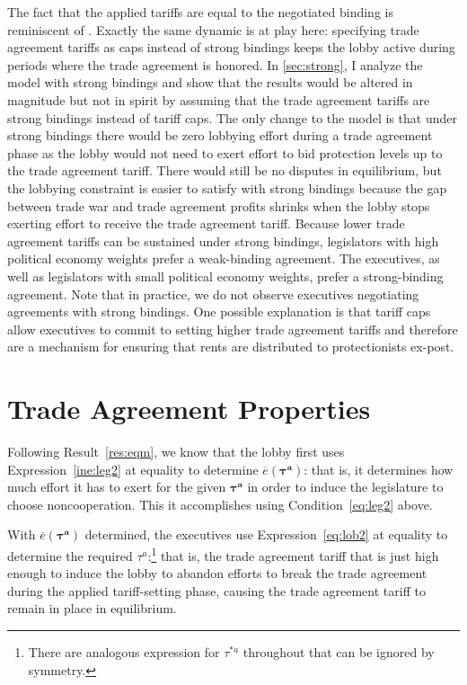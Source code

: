 \documentclass[authoryear, review]{elsarticle}
\newcommand{\ov}{\overline}
\newcommand{\bta}{\bm{\tau^a}}
\begin{document}
The fact that the applied tariffs are equal to the negotiated binding is reminiscent of \citet{mrc2007}. Exactly the same dynamic is at play here: specifying trade agreement tariffs as caps instead of strong bindings keeps the lobby active during periods where the trade agreement is honored. In \ref{sec:strong}, I analyze the model with strong bindings and show that the results would be altered in magnitude but not in spirit by assuming that the trade agreement tariffs are strong bindings instead of tariff caps. The only change to the model is that under strong bindings there would be zero lobbying effort during a trade agreement phase as the lobby would not need to exert effort to bid protection levels up to the trade agreement tariff. There would still be no disputes in equilibrium, but the lobbying constraint is easier to satisfy with strong bindings because the gap between trade war and trade agreement profits shrinks when the lobby stops exerting effort to receive the trade agreement tariff. Because lower trade agreement tariffs can be sustained under strong bindings, legislators with high political economy weights prefer a weak-binding agreement. The executives, as well as legislators with small political economy weights, prefer a strong-binding agreement. Note that in practice, we do not observe executives negotiating agreements with strong bindings. One possible explanation is that tariff caps allow executives to commit to setting higher trade agreement tariffs and therefore are a mechanism for ensuring that rents are distributed to protectionists ex-post.

\section{Trade Agreement Properties}
\label{sec:prop}
Following Result~\ref{res:eqm}, we know that the lobby first uses Expression~\ref{ine:leg2} at equality to determine $\ov{e}(\bta)$: that is, it determines how much effort it has to exert for the given $\bta$ in order to induce the legislature to choose noncooperation. This it accomplishes using Condition~\ref{eq:leg2} above.

With $\ov{e}(\bta)$ determined, the executives use Expression~\ref{eq:lob2} at equality to determine the required $\tau^a$:\footnote{There are analogous expression for $\tau^{*a}$ throughout that can be ignored by symmetry.} that is, the trade agreement tariff that is just high enough to induce the lobby to abandon efforts to break the trade agreement during the applied tariff-setting phase, causing the trade agreement tariff to remain in place in equilibrium.
\end{document}
